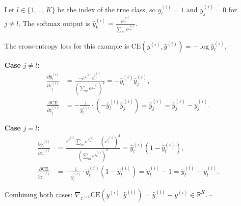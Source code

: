 \begin{answer}
Let $l \in \{1,\ldots,K\}$ be the index of the true class, so $y^{(i)}_l = 1$ and $y^{(i)}_j = 0$ for $j \neq l$. The softmax output is $\hat{y}^{(i)}_k = \frac{e^{z^{(i)}_k}}{\sum_{m} e^{z^{(i)}_m}}$.

The cross-entropy loss for this example is $\mathrm{CE}(y^{(i)}, \hat{y}^{(i)}) = -\log \hat{y}^{(i)}_l$.

\textbf{Case $j \neq l$:}
\begin{align*}
\frac{\partial \hat{y}^{(i)}_l}{\partial z^{(i)}_j} &= \frac{-e^{z^{(i)}_l} e^{z^{(i)}_j}}{\left(\sum_m e^{z^{(i)}_m}\right)^2} = -\hat{y}^{(i)}_l \hat{y}^{(i)}_j, \\
\frac{\partial \mathrm{CE}}{\partial z^{(i)}_j} &= -\frac{1}{\hat{y}^{(i)}_l}\cdot\left(-\hat{y}^{(i)}_l \hat{y}^{(i)}_j\right) = \hat{y}^{(i)}_j = \hat{y}^{(i)}_j - y^{(i)}_j.
\end{align*}

\textbf{Case $j = l$:}
\begin{align*}
\frac{\partial \hat{y}^{(i)}_l}{\partial z^{(i)}_l} &= \frac{e^{z^{(i)}_l}\sum_m e^{z^{(i)}_m} - \left(e^{z^{(i)}_l}\right)^2}{\left(\sum_m e^{z^{(i)}_m}\right)^2} = \hat{y}^{(i)}_l\left(1 - \hat{y}^{(i)}_l\right), \\
\frac{\partial \mathrm{CE}}{\partial z^{(i)}_l} &= -\frac{1}{\hat{y}^{(i)}_l}\cdot \hat{y}^{(i)}_l\left(1-\hat{y}^{(i)}_l\right) = \hat{y}^{(i)}_l - 1 = \hat{y}^{(i)}_l - y^{(i)}_l.
\end{align*}

Combining both cases: $\nabla_{z^{(i)}} \mathrm{CE}(y^{(i)}, \hat{y}^{(i)}) = \hat{y}^{(i)} - y^{(i)} \in \mathbb{R}^K$. \hfill$\square$
\end{answer}

